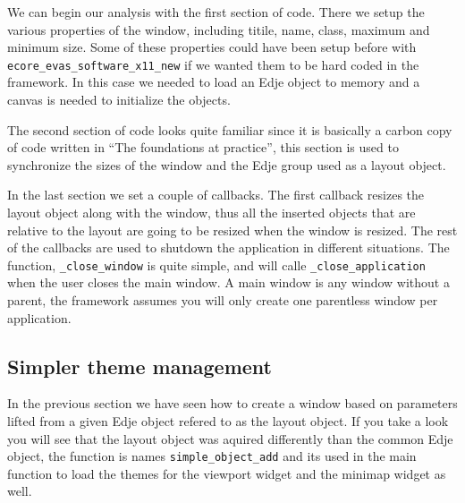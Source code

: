 \documentclass[12pt,a4paper,english]{book}
\begin{document}
We can begin our analysis with the first section of code. There we setup the
various properties of the window, including titile, name, class, maximum and
minimum size. Some of these properties could have been setup before
with \texttt{ecore{\_}evas{\_}software{\_}x11{\_}new} if we wanted them to be hard coded in the
framework. In this case we needed to load an Edje object to memory and a canvas
is needed to initialize the objects.

The second section of code looks quite familiar since it is basically a carbon
copy of code written in ``The foundations at practice'', this section is used to
synchronize the sizes of the window and the Edje group used as a layout object.

In the last section we set a couple of callbacks. The first callback resizes
the layout object along with the window, thus all the inserted objects that are
relative to the layout are going to be resized when the window is resized. The
rest of the callbacks are used to shutdown the application in different
situations. The function, \texttt{{\_}close{\_}window} is quite simple, and will calle
\texttt{{\_}close{\_}application} when the user closes the main window. A main window is
any window without a parent, the framework assumes you will only create one
parentless window per application.



\hypertarget{simpler-theme-management}{}
\subsection{Simpler theme management}

In the previous section we have seen how to create a window based on parameters
lifted from a given Edje object refered to as the layout object. If you take
a look you will see that the layout object was aquired differently than the
common Edje object, the function is names \texttt{simple{\_}object{\_}add} and its used
in the main function to load the themes for the viewport widget and the minimap
widget as well.
\end{document}
